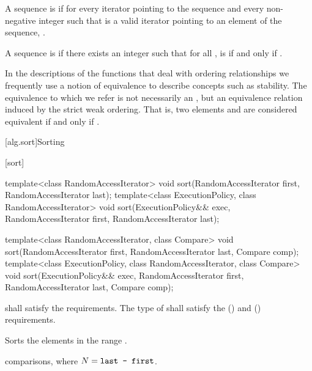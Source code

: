 \pnum
A sequence is
 if for every iterator
pointing to the sequence and every non-negative integer
such that
is a valid iterator pointing to an element of the sequence,
.

\pnum
A sequence
is
if there exists an integer
such that for all
,
is  if and only if
.

\pnum
In the descriptions of the functions that deal with ordering relationships we frequently use a notion of
equivalence to describe concepts such as stability.
The equivalence to which we refer is not necessarily an
,
but an equivalence relation induced by the strict weak ordering.
That is, two elements
and
are considered equivalent if and only if
.

[alg.sort]{Sorting}

[sort]{}

%
\begin{itemdecl}
template<class RandomAccessIterator>
  void sort(RandomAccessIterator first, RandomAccessIterator last);
template<class ExecutionPolicy, class RandomAccessIterator>
  void sort(ExecutionPolicy&& exec,
            RandomAccessIterator first, RandomAccessIterator last);

template<class RandomAccessIterator, class Compare>
  void sort(RandomAccessIterator first, RandomAccessIterator last,
            Compare comp);
template<class ExecutionPolicy, class RandomAccessIterator, class Compare>
  void sort(ExecutionPolicy&& exec,
            RandomAccessIterator first, RandomAccessIterator last,
            Compare comp);
\end{itemdecl}

\begin{itemdescr}
\pnum
\requires
{} shall satisfy the
 requirements. The type
of  shall satisfy the
 () and
 () requirements.

\pnum
\effects
Sorts the elements in the range
.

\pnum
\complexity
{} comparisons, where $N = \texttt{last - first}$.
\end{itemdescr}

